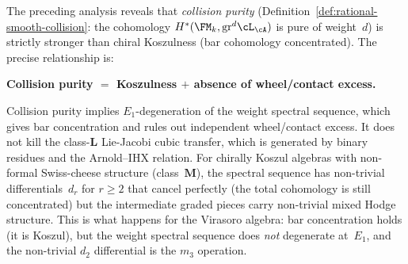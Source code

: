 \begin{remark}
\label{rem:purity-sharp-boundary}
The preceding analysis reveals that \emph{collision purity}
(Definition~\ref{def:rational-smooth-collision}: the cohomology
$H^*(\FM_k, \mathrm{gr}^d\cL_\cA)$ is pure of weight~$d$)
is strictly stronger than chiral Koszulness
(bar cohomology concentrated). The precise relationship is:

\smallskip\noindent
\textbf{Collision purity $=$ Koszulness $+$ absence of wheel/contact
excess.}
\smallskip

Collision purity implies $E_1$-degeneration of the weight spectral
sequence, which gives bar concentration and rules out independent
wheel/contact excess. It does not kill the class-$\mathbf L$
Lie-Jacobi cubic transfer, which is generated by binary residues and
the Arnold--IHX relation. For chirally Koszul algebras with non-formal
Swiss-cheese structure (class~$\mathbf{M}$), the spectral
sequence has non-trivial differentials~$d_r$ for $r \ge 2$ that
cancel perfectly (the total cohomology is still concentrated)
but the intermediate graded pieces carry non-trivial mixed Hodge
structure. This is what happens for the Virasoro algebra: bar
concentration holds (it is Koszul), but the weight spectral sequence
does \emph{not} degenerate at~$E_1$, and the non-trivial $d_2$
differential is the $m_3$ operation.


\end{remark}

